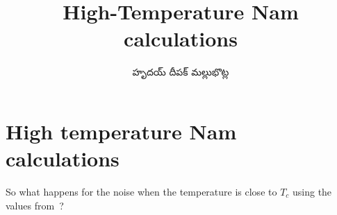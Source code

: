 \documentclass[../main.tex]{subfiles}
\title{High-Temperature Nam calculations}
\author{\begin{telugu}హృదయ్ దీపక్ మల్లుభొట్ల\end{telugu}}
\date{}
\begin{document}
	\graphicspath{{\main/figures/}}

	\onlyinsubfile{\maketitle}

	\section{High temperature Nam calculations} \label{sec:htn:intro}

	So what happens for the noise when the temperature is close to $T_c$ using the values from~\cite{Nam1967}?
\end{document}
